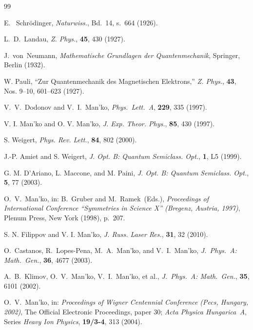\documentclass[12pt]{article}
\begin{document}
\begin{thebibliography}{99}

E.~ Schr\"odinger, {\sl Naturwiss.}, Bd.~14, s.~664
(1926).

L.~D.~Landau, {\sl Z. Phys.}, {\bf 45}, 430 (1927).

J.~von~Neumann, {\it Mathematische Grundlagen der Quantenmechanik}, Springer, Berlin
(1932).

W. Pauli,
``Zur Quantenmechanik des Magnetischen Elektrons,''
{\sl
Z. Phys.}, {\bf 43}, Nos. 9--10, 601--623 (1927).

V.~V.~Dodonov and V.~I.~Man'ko, {\sl Phys.~Lett.~A}, {\bf 229}, 335
(1997).

V. I. Man'ko and O. V. Man'ko, {\sl J. Exp. Theor. Phys.}, {\bf 85}, 430
(1997).

S. Weigert, %
{\sl Phys. Rev. Lett.}, {\bf 84},  802 (2000).

 J.-P. Amiet and S. Weigert,
{\sl J. Opt. B: Quantum Semiclass. Opt.}, {\bf 1}, L5 (1999).

 G. M. D'Ariano, L. Maccone, and M. Paini,
{\sl J. Opt. B: Quantum Semiclass. Opt.}, {\bf 5}, 77  (2003).

O.~V.~Man'ko, in: B.~Gruber and M.~Ramek~(Eds.), {\it Proceedings of
International Conference ``Symmetries in Science X'' (Bregenz,
Austria, 1997)}, Plenum Press, New York (1998), p.~207.

S. N. Filippov and V. I. Man'ko, {\sl J. Russ. Laser Res.}, {\bf
31}, 32 (2010).

O.~Castanos, R.~Lopes-Pena, M.~A.~Man'ko, and V.~I.~Man'ko, {\sl
J.~Phys.~A: Math.~Gen.}, {\bf 36}, 4677 (2003).

A.~B.~Klimov, O.~V.~Man'ko, V.~I.~Man'ko, et al.,
{\sl J.~Phys.~A: Math.~Gen.}, {\bf 35}, 6101 (2002).

O.~V.~Man'ko, in: {\it Proceedings of Wigner Centennial Conference
(Pecs, Hungary, 2002)}, The Official Electronic Proceedings, paper
30; {\sl Acta Physica Hungarica~A}, Series {\it Heavy Ion Physics},
{\bf 19/3-4}, 313 (2004).


\end{thebibliography}
\end{document}
